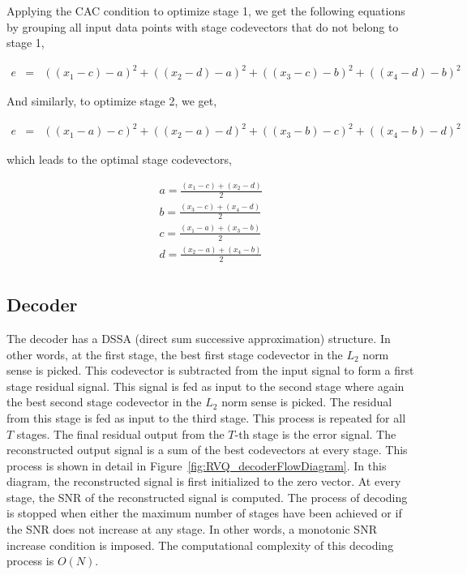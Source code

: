 Applying the CAC condition to optimize stage 1, we get the following equations by grouping all input data points with stage codevectors that do not belong to stage 1,

\begin{equation}
\begin{array}{lllll}
e &=& {((x_1 - c) - a)}^2 + {((x_2- d) - a)}^2 + {((x_3 - c) - b)}^2 + {((x_4 - d) - b)}^2
\end{array}
\label{Eqn:2x2RVQ_stage1}
\end{equation}

And similarly, to optimize stage 2, we get,

\begin{equation}
\begin{array}{lllll}
e &=& {((x_1 - a) - c)}^2 + {((x_2- a) - d)}^2 + {((x_3 - b) - c)}^2 + {((x_4 - b) - d)}^2
\end{array}
\label{Eqn:2x2RVQ_stage2}
\end{equation}

which leads to the optimal stage codevectors,

\begin{equation}
\begin{array}{lllll}
a = \frac{(x_1 - c) + (x_2 - d)}{2}\\
b = \frac{(x_3 - c) + (x_4 - d)}{2}\\
c = \frac{(x_1 - a) + (x_3 - b)}{2}\\
d = \frac{(x_2 - a) + (x_4 - b)}{2}\\
\end{array}
\end{equation}

\subsection{Decoder}
The decoder has a DSSA (direct sum successive approximation) structure.  In other words, at the first stage, the best first stage codevector in the $L_2$ norm sense is picked.  This codevector is subtracted from the input signal to form a first stage residual signal.  This signal is fed as input to the second stage where again the best second stage codevector in the $L_2$ norm sense is picked.  The residual from this stage is fed as input to the third stage.  This process is repeated for all $T$ stages.  The final residual output from the $T$-th stage is the error signal.  The reconstructed output signal is a sum of the best codevectors at every stage.  This process is shown in detail in Figure~\ref{fig:RVQ_decoderFlowDiagram}.  In this diagram, the reconstructed signal is first initialized to the zero vector.  At every stage, the SNR of the reconstructed signal is computed.  The process of decoding is stopped when either the maximum number of stages have been achieved or if the SNR does not increase at any stage.  In other words, a monotonic SNR increase condition is imposed.  The computational complexity of this decoding process is $O(N)$.  


